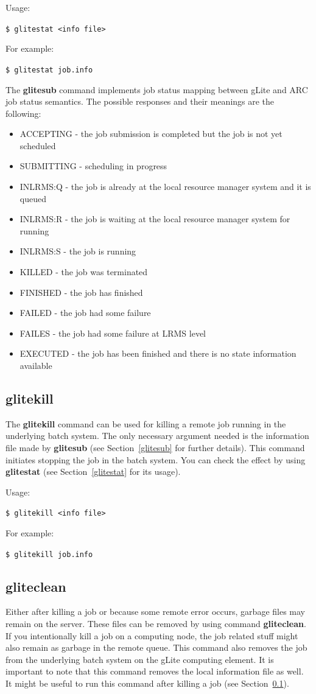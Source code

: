 \documentclass{article}
\begin{document}
Usage:
\begin{shaded}\verb#$ glitestat <info file>#\end{shaded}%
For example:
\begin{shaded}\verb#$ glitestat job.info#\end{shaded}%
The \textbf{glitesub} command implements job status mapping between gLite and ARC job status semantics. The possible responses and their meanings are the following:
\begin{itemize}
\item ACCEPTING - the job submission is completed but the job is not yet scheduled
\item SUBMITTING - scheduling in progress
\item INLRMS:Q - the job is already at the local resource manager system and it is queued
\item INLRMS:R - the job is waiting at the local resource manager system for running
\item INLRMS:S - the job is running
\item KILLED - the job was terminated
\item FINISHED - the job has finished
\item FAILED - the job had some failure
\item FAILES - the job had some failure at LRMS level
\item EXECUTED - the job has been finished and there is no state information available
\end{itemize}

\subsection{glitekill}
\label{glitekill}
The \textbf{glitekill} command can be used for killing a remote job running in the underlying batch system. The only necessary argument needed is the information file made by \textbf{glitesub} (see Section~\ref{glitesub} for further details). This command initiates stopping the job in the batch system. You can check the effect by using \textbf{glitestat} (see Section~\ref{glitestat} for its usage).

Usage:
\begin{shaded}\verb#$ glitekill <info file>#\end{shaded}%
For example:
\begin{shaded}\verb#$ glitekill job.info#\end{shaded}%

\subsection{gliteclean}
\label{gliteclean}
Either after killing a job or because some remote error occurs, garbage files may remain on the server. These files can be removed by using command \textbf{gliteclean}. If you intentionally kill a job on a computing node, the job related stuff might also remain as garbage in the remote queue. This command also removes the job from the underlying batch system on the gLite computing element. It is important to note that this command removes the local information file as well. It might be useful to run this command after killing a job (see Section~\ref{glitekill}).
\end{document}

